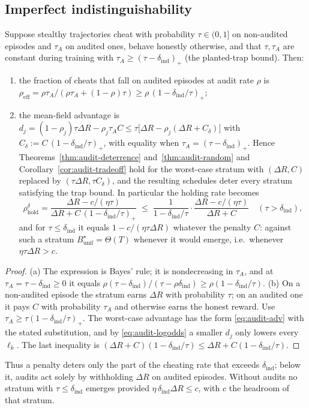 \subsection{Imperfect indistinguishability}

\begin{proposition}
\label{prop:audit-indist}
Suppose stealthy trajectories cheat with probability $\tau\in(0,1]$ on
non-audited episodes and $\tau_A$ on audited ones, behave honestly otherwise,
and that $\tau,\tau_A$ are constant during training with
$\tau_A\ge(\tau-\delta_{\mathrm{ind}})_+$ (the planted-trap bound). Then:
\begin{enumerate}
\item[\textup{(a)}] the fraction of cheats that fall on audited episodes at
audit rate $\rho$ is
$\rho_{\mathrm{eff}}=\rho\tau_A/(\rho\tau_A+(1-\rho)\tau)\ge\rho\,(1-\delta_{\mathrm{ind}}/\tau)_+$;
\item[\textup{(b)}] the mean-field advantage is
$d_j=(1-\rho_j)\tau\Delta R-\rho_j\tau_AC\le\tau\bigl[\Delta R-\rho_j(\Delta R+C_\delta)\bigr]$
with $C_\delta:=C\,(1-\delta_{\mathrm{ind}}/\tau)_+$, with equality when
$\tau_A=(\tau-\delta_{\mathrm{ind}})_+$. Hence
Theorems~\ref{thm:audit-deterrence} and~\ref{thm:audit-random} and
Corollary~\ref{cor:audit-tradeoff} hold for the worst-case stratum with
$(\Delta R,C)$ replaced by $(\tau\Delta R,\tau C_\delta)$, and the resulting
schedules deter every stratum satisfying the trap bound. In particular the
holding rate becomes
\[
  \rho^{\delta}_{\mathrm{hold}}=\frac{\Delta R-c/(\eta\tau)}{\Delta R+C\,(1-\delta_{\mathrm{ind}}/\tau)_+}
  \;\le\;\frac{1}{1-\delta_{\mathrm{ind}}/\tau}\cdot\frac{\Delta R-c/(\eta\tau)}{\Delta R+C}
  \quad(\tau>\delta_{\mathrm{ind}}),
\]
and for $\tau\le\delta_{\mathrm{ind}}$ it equals $1-c/(\eta\tau\Delta R)$
whatever the penalty $C$: against such a stratum $B^\star_{\mathrm{unif}}=\Theta(T)$
whenever it would emerge, i.e.\ whenever $\eta\tau\Delta R>c$.
\end{enumerate}
\end{proposition}
\begin{proof}
(a) The expression is Bayes' rule; it is nondecreasing in $\tau_A$, and at
$\tau_A=\tau-\delta_{\mathrm{ind}}\ge0$ it equals
$\rho(\tau-\delta_{\mathrm{ind}})/(\tau-\rho\delta_{\mathrm{ind}})\ge\rho(1-\delta_{\mathrm{ind}}/\tau)$.
(b) On a non-audited episode the stratum earns $\Delta R$ with probability
$\tau$; on an audited one it pays $C$ with probability $\tau_A$ and otherwise
earns the honest reward. Use $\tau_A\ge\tau(1-\delta_{\mathrm{ind}}/\tau)_+$.
The worst-case advantage has the form \eqref{eq:audit-adv} with the stated
substitution, and by \eqref{eq:audit-logodds} a smaller $d_j$ only lowers every
$\ell_k$. The last inequality is
$(\Delta R+C)(1-\delta_{\mathrm{ind}}/\tau)\le\Delta R+C(1-\delta_{\mathrm{ind}}/\tau)$.
\end{proof}
\noindent
Thus a penalty deters only the part of the cheating rate that exceeds
$\delta_{\mathrm{ind}}$; below it, audits act solely by withholding $\Delta R$
on audited episodes. Without audits no stratum with
$\tau\le\delta_{\mathrm{ind}}$ emerges provided
$\eta\,\delta_{\mathrm{ind}}\Delta R\le c$, with $c$ the headroom of that
stratum.

